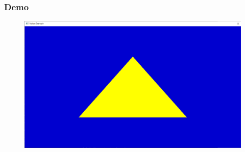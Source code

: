 \begin{frame}
\frametitle{Demo}

\begin{figure}[ht]
    \centering
    \includegraphics[scale=0.25]{images/SlidesTriangle/Triangle.png}
\end{figure}

\end{frame}
